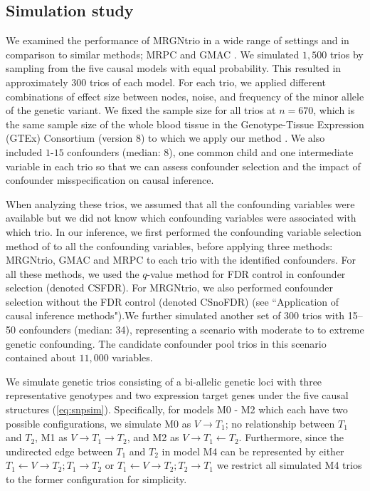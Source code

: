 \documentclass[12pt,letterpaper]{report}
\begin{document}
\begin{doublespace}
\subsection{Simulation study}
We examined the performance of MRGNtrio in a wide range of settings and in comparison to similar methods; MRPC \cite{badsha2019learning} and GMAC \cite{yang2017identifying}. We simulated $1,500$ trios by sampling from the five causal models with equal probability. This resulted in approximately $300$ trios of each model. For each trio, we applied different combinations of effect size between nodes, noise, and frequency of the minor allele of the genetic variant. We fixed the sample size for all trios at $n = 670$, which is the same sample size of the whole blood tissue in the Genotype-Tissue Expression (GTEx) Consortium (version 8) to which we apply our method \cite{gtex2020}.  We also included $1$-$15$ confounders (median: 8), one common child and one intermediate variable in each trio so that we can assess confounder selection and the impact of confounder misspecification on causal inference.      

When analyzing these trios, we assumed that all the confounding variables were available but we did not know which confounding variables were associated with which trio. In our inference, we first performed the confounding variable selection method of \cite{yang2017identifying} to all the confounding variables, before applying three methods: MRGNtrio, GMAC and MRPC to each trio with the identified confounders. For all these methods, we used the $q$-value \cite{storey2003positive,storey2002qvalue} method for FDR control in confounder selection (denoted CSFDR). For MRGNtrio, we also performed confounder selection without the FDR control (denoted CSnoFDR) (see ``Application of causal inference methods").We further simulated another set of 300 trios with 15–50 confounders (median: 34), representing a scenario with moderate to to extreme genetic confounding. The candidate confounder pool trios in this scenario contained about $11,000$ variables.

We simulate genetic trios consisting of a bi-allelic genetic loci with three representative genotypes and two expression target genes under the five causal structures (\autoref{eq:snpsim}). Specifically, for models M0 - M2 which each have two possible configurations, we simulate M0 as $V \rightarrow T_1$; no relationship between $T_1$ and $T_2$, M1 as $V\rightarrow T_1 \rightarrow T_2$, and M2 as $V\rightarrow T_1 \leftarrow T_2$. Furthermore, since the undirected edge between $T_1$ and $T_2$ in model M4 can be represented by either $T_1 \leftarrow V \rightarrow T_2; T_1 \rightarrow T_2$ or $T_1 \leftarrow V \rightarrow T_2; T_2 \rightarrow T_1$ we restrict all simulated M4 trios to the former configuration for simplicity. 


\end{doublespace}
\end{document}
